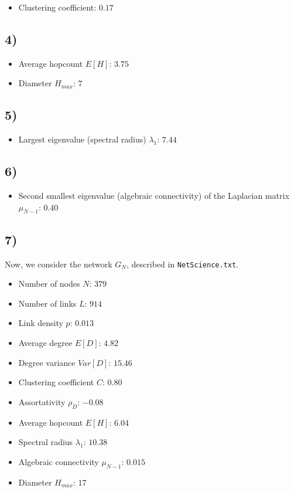 \documentclass{article}
\begin{document}
\begin{itemize}
  \item Clustering coefficient: $0.17$
\end{itemize}

\subsection*{4)}

\begin{itemize}
  \item Average hopcount $E[H]$: $3.75$
  \item Diameter $H_{max}$: $7$
\end{itemize}

\subsection*{5)}
\begin{itemize}
  \item Largest eigenvalue (spectral radius) $\lambda_1$: $7.44$
\end{itemize}
\subsection*{6)}

\begin{itemize}
\item Second smallest eigenvalue (algebraic connectivity) of the
  Laplacian matrix $\mu_{N-1}$: $0.40$
\end{itemize}

\subsection*{7)}
Now, we consider the network $G_N$, described in \texttt{NetScience.txt}.

\begin{itemize}
\item Number of nodes $N$: $379$
\item Number of links $L$: $914$
\item Link density $p$: $0.013$
\item Average degree $E[D]$: $4.82$
\item Degree variance $Var[D]$: $15.46$
\item Clustering coefficient $C$: $0.80$
\item Assortativity $\rho_D$: $-0.08$
\item Average hopcount $E[H]$: $6.04$
\item Spectral radius $\lambda_1$: $10.38$
\item Algebraic connectivity $\mu_{N-1}$: $0.015$
\item Diameter $H_{max}$: $17$
\end{itemize}
\end{document}
